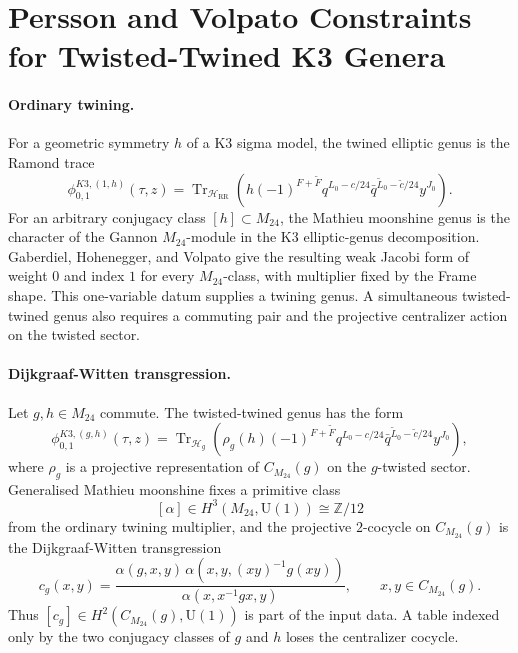\providecommand{\CMg}{C_{M_{24}}}
\providecommand{\Uone}{\mathrm{U}(1)}
\providecommand{\Tr}{\operatorname{Tr}}
\providecommand{\ord}{\operatorname{ord}}
\providecommand{\kBKM}{\kappa_{\mathrm{BKM}}}
\providecommand{\kcat}{\kappa_{\mathrm{cat}}}
\providecommand{\kch}{\kappa_{\mathrm{ch}}}
\providecommand{\kchHeis}{\kappa_{\mathrm{ch}}^{\mathrm{Heis}}}
\providecommand{\kfiber}{\kappa_{\mathrm{fiber}}}
\providecommand{\PhiN}{\Phi_N}
\providecommand{\Zgh}{\phi^{K3,(g,h)}_{0,1}}
\providecommand{\Dfive}{D_5}

\section*{Persson and Volpato Constraints for Twisted-Twined K3 Genera}

\paragraph{Ordinary twining.}
For a geometric symmetry \(h\) of a K3 sigma model, the twined elliptic
genus is the Ramond trace
\[
  \phi^{K3,(1,h)}_{0,1}(\tau,z)
  =
  \Tr_{\mathcal H_{\mathrm{RR}}}
  \left(h(-1)^{F+\widetilde F}q^{L_0-c/24}
  \bar q^{\widetilde L_0-\widetilde c/24}y^{J_0}\right).
\]
For an arbitrary conjugacy class \([h]\subset M_{24}\), the Mathieu
moonshine genus is the character of the Gannon \(M_{24}\)-module in the
K3 elliptic-genus decomposition.  Gaberdiel, Hohenegger, and Volpato
give the resulting weak Jacobi form of weight \(0\) and index \(1\) for
every \(M_{24}\)-class, with multiplier fixed by the Frame shape.
This one-variable datum supplies a twining genus.  A simultaneous
twisted-twined genus also requires a commuting pair and the projective
centralizer action on the twisted sector.

\paragraph{Dijkgraaf-Witten transgression.}
Let \(g,h\in M_{24}\) commute.  The twisted-twined genus has the form
\[
  \Zgh(\tau,z)
  =
  \Tr_{\mathcal H_g}
  \left(\rho_g(h)(-1)^{F+\widetilde F}q^{L_0-c/24}
  \bar q^{\widetilde L_0-\widetilde c/24}y^{J_0}\right),
\]
where \(\rho_g\) is a projective representation of \(\CMg(g)\) on the
\(g\)-twisted sector.  Generalised Mathieu moonshine fixes a primitive
class
\[
  [\alpha]\in H^3(M_{24},\Uone)\cong \mathbb Z/12
\]
from the ordinary twining multiplier, and the projective \(2\)-cocycle
on \(\CMg(g)\) is the Dijkgraaf-Witten transgression
\[
  c_g(x,y)
  =
  \frac{\alpha(g,x,y)\,
        \alpha(x,y,(xy)^{-1}g(xy))}
       {\alpha(x,x^{-1}gx,y)},
  \qquad x,y\in \CMg(g).
\]
Thus \([c_g]\in H^2(\CMg(g),\Uone)\) is part of the input data.  A table
indexed only by the two conjugacy classes of \(g\) and \(h\) loses the
centralizer cocycle.

